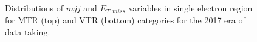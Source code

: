 \begin{figure}[htbp]
{    }
  \caption{Distributions of $mjj$ and $E_{T,miss}$ variables in single electron region for MTR (top) and VTR (bottom) categories for the 2017 era of data taking.}
  \label{fig:2017_Wenu_1}
\end{figure}

